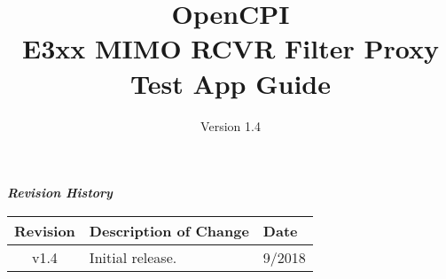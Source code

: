 \iffalse
This file is protected by Copyright. Please refer to the COPYRIGHT file
distributed with this source distribution.

This file is part of OpenCPI <http://www.opencpi.org>

OpenCPI is free software: you can redistribute it and/or modify it under the
terms of the GNU Lesser General Public License as published by the Free Software
Foundation, either version 3 of the License, or (at your option) any later
version.

OpenCPI is distributed in the hope that it will be useful, but WITHOUT ANY
WARRANTY; without even the implied warranty of MERCHANTABILITY or FITNESS FOR A
PARTICULAR PURPOSE. See the GNU Lesser General Public License for more details.

You should have received a copy of the GNU Lesser General Public License along
with this program. If not, see <http://www.gnu.org/licenses/>.
\fi

\def\docTitle{OpenCPI\\ E3xx MIMO RCVR Filter Proxy Test App Guide}
\def\docVersion{1.4}

\date{Version \docVersion} %
\title{\docTitle}
\usepackage{graphicx}
\graphicspath{ {figures/} }
\usepackage{textcomp}
\usepackage{listings}


\maketitle
	\begin{center}
	\textit{\textbf{Revision History}}
		\begin{table}[H]
		\label{table:revisions} %
			\begin{tabularx}{\textwidth}{|c|X|l|}
			\hline
			\rowcolor{blue}
			\textbf{Revision} & \textbf{Description of Change} & \textbf{Date} \\
		    \hline
		    v1.4 & Initial release. & 9/2018 \\
			\hline
			\end{tabularx}
		\end{table}
	\end{center}

